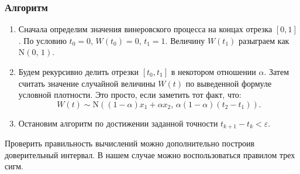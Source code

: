 \subsubsection{Алгоритм}
        \begin{enumerate}
                \item
Сначала определим значения винеровского процесса на концах отрезка $[0,1]$. По условию $t_0 = 0$, $W(t_0) = 0$, $t_1 = 1$. Величину $W(t_1)$ разыграем как $\mathrm{N}(0,\,1)$.
        \item
Будем рекурсивно делить отрезки $[t_0, t_1]$ в некотором отношении $\alpha$. Затем считать значение случайной величины $W(t)$ по выведенной формуле условной плотности. Это просто, если заметить тот факт, что:
$$
        W(t)
\sim
        \mathrm{N}
        (
          (1 - \alpha)
          x_1
          +
          \alpha
          x_2
        ,\,
          \alpha
          (1 - \alpha)
          (t_2 - t_1)
        ).
$$
        \item
Остановим алгоритм по достижении заданной точности $t_{k+1} - t_k < \varepsilon$.
\end{enumerate}
\begin{remark}
        Проверить правильность вычислений можно дополнительно построив доверительный интервал. В нашем случае можно воспользоваться правилом трех сигм.
\end{remark}





